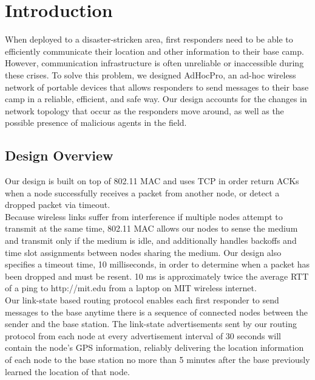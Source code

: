 \documentclass[letterpaper]{article}
\begin{document}
\section{Introduction}

When deployed to a disaster-stricken area, first responders need to be able to efficiently communicate their
location and other information to their base camp. However, communication infrastructure is often unreliable
or inaccessible during these crises. To solve this problem, we designed AdHocPro, an ad-hoc wireless network of
portable devices that allows responders to send messages to their base camp in a reliable, efficient, and safe
way. Our design accounts for the changes in network topology that occur as the responders move 
around, as well as the possible presence of malicious agents in the field. 

\subsection{Design Overview}

Our design is built on top of 802.11 MAC and uses TCP in order return ACKs when a node successfully receives
a packet from another node, or detect a dropped packet via timeout.
\\

\noindent Because wireless links suffer from interference if multiple nodes attempt to transmit at the same time, 802.11 MAC allows our nodes to sense the medium and transmit only if the medium is idle, and additionally handles
backoffs and time slot assignments between nodes sharing the medium. Our design also specifies a timeout time, 
10 milliseconds, in order to determine when a packet has been dropped and must be resent. 10 ms is approximately 
twice the average RTT of a ping to http://mit.edu from a laptop on MIT wireless internet.
\\

\noindent Our link-state based routing protocol enables each first responder to send messages to the base anytime
there is a sequence of connected nodes between the sender and the base station. The link-state advertisements 
sent by our routing protocol from each node at every advertisement interval of 30 seconds will contain the node's
GPS  information, reliably delivering the location information of each node to the base station no more than
5 minutes after the base previously learned the location of that node.
\\
\end{document}
